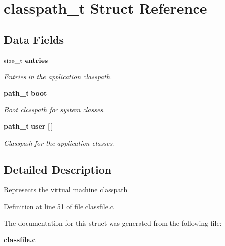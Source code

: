 \section{classpath\_\-t Struct Reference}
\label{structclasspath__t}
\subsection*{Data Fields}
\begin{DoxyCompactItemize}
\item 
size\_\-t {\bf entries}\label{structclasspath__t_ad21b3dca8d33e8d603933b3ad177163b}

\begin{DoxyCompactList}\small\item\em Entries in the application classpath. \item\end{DoxyCompactList}\item 
{\bf path\_\-t} {\bf boot}\label{structclasspath__t_a46b2205c768a84f648b385339d0ca0b0}

\begin{DoxyCompactList}\small\item\em Boot classpath for system classes. \item\end{DoxyCompactList}\item 
{\bf path\_\-t} {\bf user} [$\,$]\label{structclasspath__t_ac763ff9ce2a55c286c4aad498dc09477}

\begin{DoxyCompactList}\small\item\em Classpath for the application classes. \item\end{DoxyCompactList}\end{DoxyCompactItemize}


\subsection{Detailed Description}
Represents the virtual machine classpath 

Definition at line 51 of file classfile.c.



The documentation for this struct was generated from the following file:\begin{DoxyCompactItemize}
\item 
{\bf classfile.c}\end{DoxyCompactItemize}
